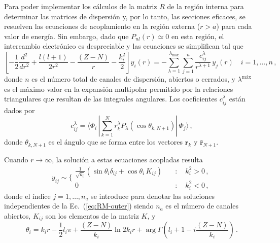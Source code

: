 Para poder implementar los cálculos de la matriz $R$ de la región 
interna para determinar las matrices de dispersión y, por lo tanto, las 
secciones eficaces, se resuelven las ecuaciones de acoplamiento en la 
región externa ($r>a$) para cada valor de energía. Sin embargo, dado 
que $P_{nl}(r)\simeq 0$ en esta región, el intercambio electrónico es
despreciable y las ecuaciones se simplifican tal que
\begin{equation}
\left[-\frac{1}{2}\frac{d^2}{dr^2}+\frac{l(l+1)}{2r^2}-\frac{(Z-N)}{r}
-\frac{k_i^2}{2}\right]y_i(r)=-\sum_{\lambda=1}^{\lambda_{\textrm{máx}}}
\sum_{j=1}^{n}\frac{c_{ij}^{\lambda}}{r^{\lambda+1}}\,y_j(r)
\quad i=1,\dots, n\,,
\label{eq:RM-outer}
\end{equation}
donde $n$ es el número total de canales de dispersión, abiertos o 
cerrados, y $\lambda^{\textrm{máx}}$ es el máximo valor en la expansión
multipolar permitido por la relaciones triangulares que resultan de las 
integrales angulares. Los coeficientes $c_{ij}^{\lambda}$ están dados 
por
\begin{equation}
c_{ij}^{\lambda}=\langle\bar{\Phi}_i\,|\sum_{k=1}^Nr_k^{\lambda}
P_{\lambda}\left(\cos\theta_{k,N+1}\right)|\,\bar{\Phi}_j\rangle\,,
\end{equation}
donde $\theta_{k,N+1}$ es el ángulo que se forma entre los vectores 
$\hat{\mathbf{r}}_{k}$ y $\hat{\mathbf{r}}_{N+1}$. 

Cuando $r\rightarrow\infty$, la solución a estas ecuaciones acopladas
resulta
\begin{equation}
y_{ij}\sim\bigg\{
\begin{array}{ll}
\frac{1}{\sqrt{k_i}}\left(\sin\theta_i\delta_{ij}
+\cos\theta_i\,K_{ij}\right) &\quad:\quad k_i^2>0\,,\\
0 &\quad:\quad k_i^2<0\,,
\end{array}
\end{equation}
donde el índice $j=1,\dots,n_a$ se introduce para denotar las soluciones 
independientes de la Ec.~(\ref{eq:RM-outer}) siendo $n_a$ es el número 
de canales abiertos, $K_{ij}$ son los elementos de la matriz $K$, y 
\begin{equation}
\theta_i=k_ir-\frac{1}{2}l_i\pi+\frac{(Z-N)}{k_i}\ln 2k_i r +\arg \Gamma
\left(l_i+1-i\frac{(Z-N)}{k_i}\right)\,.
\end{equation}

